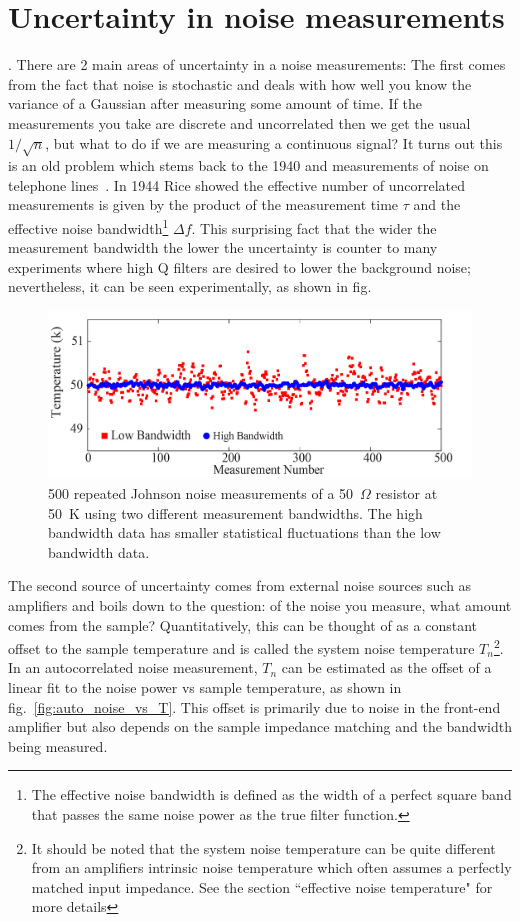 \section{Uncertainty in noise measurements}
. There are 2 main areas of uncertainty in a noise measurements: The first comes from the fact that noise is stochastic and deals with how well you know the variance of a Gaussian after measuring some amount of time. If the measurements you take are discrete and uncorrelated then we get the usual $1/\sqrt{n}$, but what to do if we are measuring a continuous signal? It turns out this is an old problem which stems back to the 1940 and measurements of noise on telephone lines~\cite{rice}. In 1944 Rice showed the effective number of uncorrelated measurements is given by the product of the measurement time $\tau$ and the effective noise bandwidth\footnote{The effective noise bandwidth is defined as the width of a perfect square band that passes the same noise power as the true filter function.} $\Delta f$. This surprising fact that the wider the measurement bandwidth the lower the uncertainty is counter to many experiments where high Q filters are desired to lower the background noise; nevertheless, it can be seen experimentally, as shown in fig.~\cite{fig:JNT_500measurements}
\begin{figure}
\centering
\includegraphics[width=120mm]{figures/Johnson_noise_thermometry/500_measurements.png}
\caption{500 repeated Johnson noise measurements of a 50~$\Omega$ resistor at 50~K using two different measurement bandwidths. The high bandwidth data has smaller statistical fluctuations than the low bandwidth data.}
\label{fig:JNT_500measurements}
\end{figure}

The second source of uncertainty comes from external noise sources such as amplifiers and boils down to the question: of the noise you measure, what amount comes from the sample? Quantitatively, this can be thought of as a constant offset to the sample temperature and is called the system noise temperature $T_n$\footnote{It should be noted that the system noise temperature can be quite different from an amplifiers intrinsic noise temperature which often assumes a perfectly matched input impedance. See the section ``effective noise temperature" for more details}. In an autocorrelated noise measurement, $T_n$ can be estimated as the offset of a linear fit to the noise power vs sample temperature, as shown in fig.~\ref{fig:auto_noise_vs_T}. This offset is primarily due to noise in the front-end amplifier but also depends on the sample impedance matching and the bandwidth being measured.

